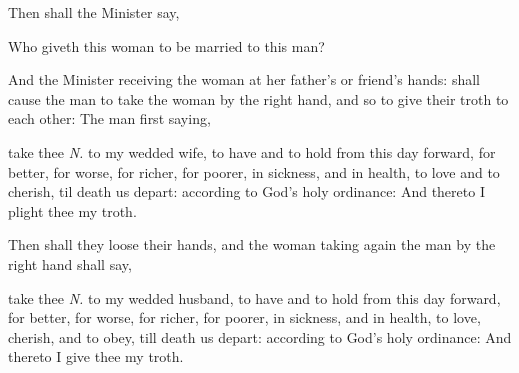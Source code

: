 \begin{rubric}
	Then shall the Minister say,
\end{rubric}\noindent
Who giveth this woman to be married to this man?
\begin{rubric}
	And the Minister receiving the woman at her father's or friend's hands: shall cause the man to take the woman by the right hand, and so to give their troth to each other: The man first saying,
\end{rubric}
 take thee \textit{N.} to my wedded wife, to have and to hold from this day forward, for better, for worse, for richer, for poorer, in sickness, and in health, to love and to cherish, 
til death us depart: according to God's holy ordinance: And thereto I plight thee my troth.
\begin{rubric}
	Then shall they loose their hands, and the woman taking again the man by the right hand shall say,
\end{rubric}
 take thee \textit{N.} to my wedded husband, to have and to hold from this day forward, for better, for worse, for richer, for poorer, in sickness, and in health, to love, cherish, and to obey, till death us depart: according to God's holy ordinance: And thereto I give thee my troth.

